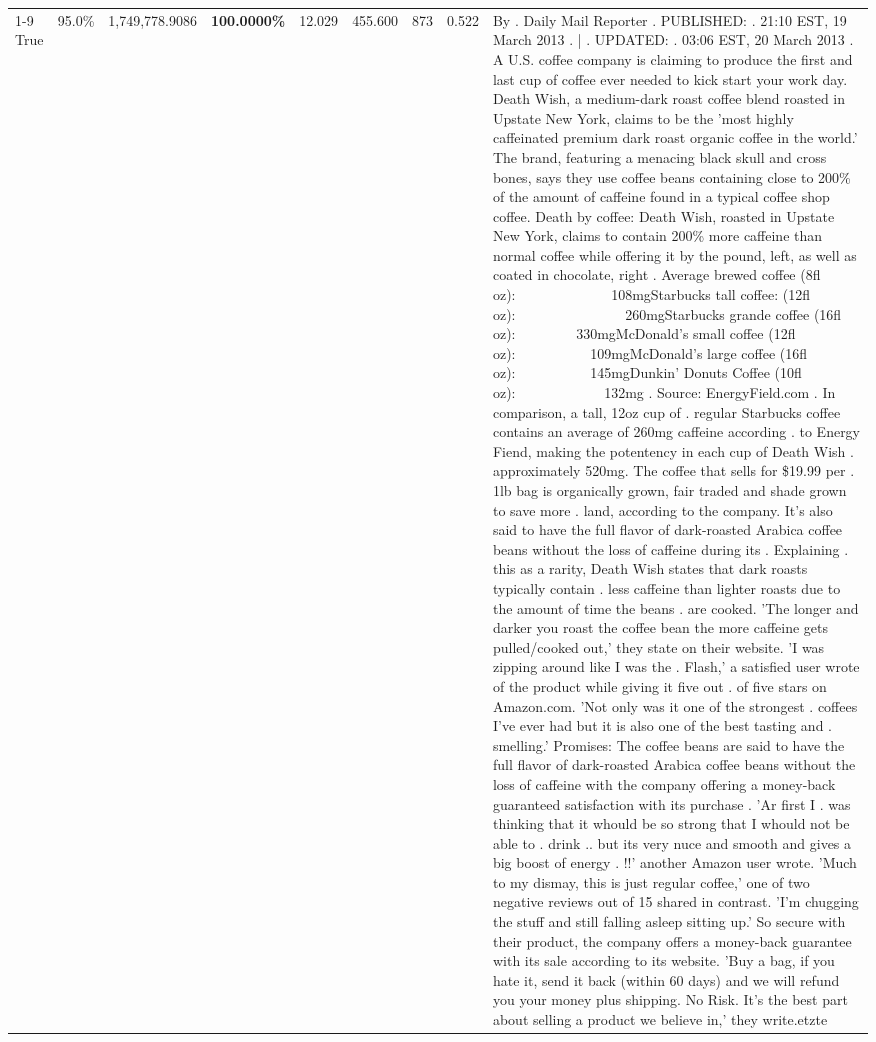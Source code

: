 \begin{table}[H]
{\begin{tabular}{lllrlllll}
\cline{1-9}
True & 95.0\% & 1,749,778.9086 & \bfseries \color{red} 100.0000\% & 12.029 & 455.600 & 873 & 0.522 & By . Daily Mail Reporter . PUBLISHED: . 21:10 EST, 19 March 2013 . | . UPDATED: . 03:06 EST, 20 March 2013 . A U.S. coffee company is claiming to produce the first and last cup of coffee ever needed to kick start your work day. Death Wish, a medium-dark roast coffee blend roasted in Upstate New York, claims to be the 'most highly caffeinated premium dark roast organic coffee in the world.' The brand, featuring a menacing black skull and cross bones, says they use coffee beans containing close to 200\% of the amount of caffeine found in a typical coffee shop coffee. Death by coffee: Death Wish, roasted in Upstate New York, claims to contain 200\% more caffeine than normal coffee while offering it by the pound, left, as well as coated in chocolate, right . Average brewed coffee (8fl oz):              108mgStarbucks tall coffee: (12fl oz):                260mgStarbucks grande coffee (16fl oz):         330mgMcDonald's small coffee (12fl oz):           109mgMcDonald's large coffee (16fl oz):           145mgDunkin' Donuts Coffee (10fl oz):             132mg . Source: EnergyField.com . In comparison, a tall, 12oz cup of . regular Starbucks coffee contains an average of 260mg caffeine according . to Energy Fiend, making the potentency in each cup of Death Wish . approximately 520mg. The coffee that sells for \$19.99 per . 1lb bag is organically grown, fair traded and shade grown to save more . land, according to the company. It's also said to have the full flavor of dark-roasted Arabica coffee beans without the loss of caffeine during its . Explaining . this as a rarity, Death Wish states that dark roasts typically contain . less caffeine than lighter roasts due to the amount of time the beans . are cooked. 'The longer and darker you roast the coffee bean the more caffeine gets pulled/cooked out,' they state on their website. 'I was zipping around like I was the . Flash,' a satisfied user wrote of the product while giving it five out . of five stars on Amazon.com. 'Not only was it one of the strongest . coffees I've ever had but it is also one of the best tasting and . smelling.’ Promises: The coffee beans are said to have the full flavor of dark-roasted Arabica coffee beans without the loss of caffeine with the company offering a money-back guaranteed satisfaction with its purchase . 'Ar first I . was thinking that it whould be so strong that I whould not be able to . drink .. but its very nuce and smooth and gives a big boost of energy . !!' another Amazon user wrote. 'Much to my dismay, this is just regular coffee,' one of two negative reviews out of 15 shared in contrast. 'I'm chugging the stuff and still falling asleep sitting up.' So secure with their product, the company offers a money-back guarantee with its sale according to its website. 'Buy a bag, if you hate it, send it back (within 60 days) and we will refund you your money plus shipping. No Risk. It’s the best part about selling a product we believe in,' they write.etzte \\

\end{tabular}}
\end{table}
